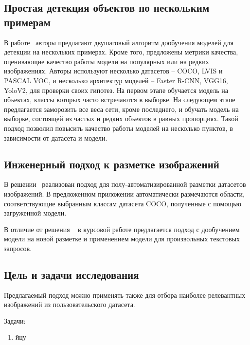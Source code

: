 \documentclass[a4paper,14pt]{article}
\begin{document}
    \subsection{Простая детекция объектов по нескольким примерам}

    В работе~\cite{wang2020few} авторы предлагают двушаговый алгоритм дообучения моделей для детекции на нескольких примерах.
    Кроме того, предложены метрики качества, оценивающие качество работы модели на популярных или на редких изображениях.
    Авторы используют несколько датасетов -- COCO, LVIS и PASCAL VOC,
    и несколько архитектур моделей -- Faster R-CNN, VGG16, YoloV2, для проверки своих гипотез.
    На первом этапе обучается модель на объектах, классы которых часто встречаются в выборке.
    На следующем этапе предлагается заморозить все веса сети, кроме последнего, и обучать модель на выборке, состоящей из частых и редких объектов в равных пропорциях.
    Такой подход позволил повысить качество работы моделей на несколько пунктов, в зависимости от датасета и модели.

    \subsection{Инженерный подход к разметке изображений}

    В решении~\cite{AnnoMage} реализован подход для полу-автоматизированной разметки датасетов изображений. 
    В предложенном приложении автоматически размечаются области, соответствующие выбранным классам датасета COCO, полученные с помощью загруженной модели.

    В отличие от решения ~\cite{AnnoMage} в курсовой работе предлагается подход с дообучением модели на новой разметке и применением модели для произвольных текстовых запросов.

    \subsection{Цель и задачи исследования}
    
    Предлагаемый подход можно применять также для отбора наиболее релевантных изображений из пользовательского датасета.

    Задачи:
    \begin{enumerate}
        [1)]
        \itemsep0em
        \item йцу

    \end{enumerate}
\end{document}
